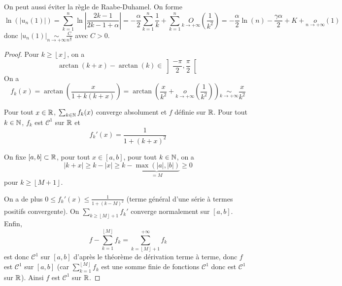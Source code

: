 \documentclass[12pt]{article}
\begin{document}
\begin{remark}
    On peut aussi éviter la règle de Raabe-Duhamel. On forme 
    \begin{equation}
        \ln\left(\left\lvert u_{n}(1)\right\rvert\right)=\sum_{k=1}^{n}\ln\left\lvert\frac{2k-1}{2k-1+\alpha}\right\rvert=-\frac{\alpha}{2}\sum_{k=1}^{n}\frac{1}{k}+\sum_{k=1}^{n}\underset{k\to+\infty}{O}\left(\frac{1}{k^{2}}\right)=-\frac{\alpha}{2}\ln(n)-\frac{\gamma\alpha}{2}+K+\underset{n\to+\infty}{o}\left(1\right)
    \end{equation}
    donc $\left\lvert u_{n}(1)\right\rvert\underset{n\to+\infty}{\sim}\frac{C}{n^{\frac{\alpha}{2}}}$ avec $C>0$.
\end{remark}

\begin{proof}
    Pour $k\geqslant \left\lfloor x\right\rfloor$, on a 
    \begin{equation}
        \arctan(k+x)-\arctan(k)\in\left]\frac{-\pi}{2},\frac{\pi}{2}\right[
    \end{equation}
    On a 
    \begin{equation}
        f_{k}(x)=\arctan\left(\frac{x}{1+k(k+x)}\right)=\arctan\left(\frac{x}{k^{2}}+\underset{k\to+\infty}{o}\left(\frac{1}{k^{2}}\right)\right)\underset{k\to+\infty}{\sim}\frac{x}{k^{2}}
    \end{equation}

    Pour tout $x\in\mathbb{R}$, $\sum_{k\in\mathbb{N}}f_{k}(x)$ converge absolument et $f$ définie sur $\mathbb{R}$. Pour tout $k\in\mathbb{N}$, $f_{k}$ est $\mathcal{C}^{1}$ sur $\mathbb{R}$ et 
    \begin{equation}
        f_{k}'(x)=\frac{1}{1+(k+x)^{2}}
    \end{equation}

    On fixe $[a,b]\subset\mathbb{R}$, pour tout $x\in[a,b]$, pour tout $k\in\mathbb{N}$, on a \begin{equation}
        \left\lvert k+x\right\rvert\geqslant k-\left\lvert x\right\rvert \geqslant k-\underbrace{\max\left(\left\lvert a\right\rvert,\left\lvert b\right\rvert\right)}_{=M}\geqslant 0    
    \end{equation}
    pour $k\geqslant \left\lfloor M+1\right\rfloor$.

    On a de plus $0\leqslant f_{k}'(x)\leqslant \frac{1}{1+(k-M)^{2}}$ (terme général d'une série à termes positifs convergente). On $\sum_{k\geqslant\left\lfloor M\right\rfloor+1}f_{k}'$ converge normalement sur $[a,b]$. Enfin, 
    \begin{equation}
        f-\sum_{k=1}^{\left\lfloor M\right\rfloor}f_{k}=\sum_{k=\left\lfloor M\right\rfloor+1}^{+\infty}f_{k}
    \end{equation}
    est donc $\mathcal{C}^{1}$ sur $[a,b]$ d'après le théorème de dérivation terme à terme, donc $f$ est $\mathcal{C}^{1}$ sur $[a,b]$ (car $\sum_{k=1}^{\left\lfloor M\right\rfloor}f_{k}$ est une somme finie de fonctions $\mathcal{C}^{1}$ donc est $\mathcal{C}^{1}$ sur $\mathbb{R}$). Ainsi $f$ est $\mathcal{C}^{1}$ sur $\mathbb{R}$.


\end{proof}
\end{document}
